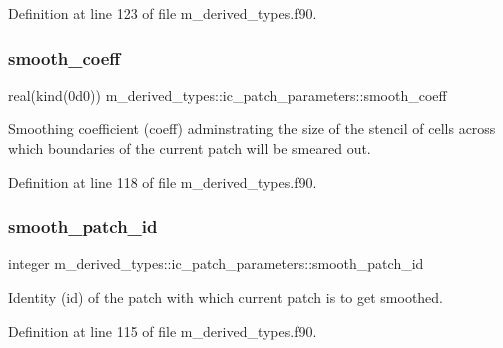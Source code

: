 Definition at line 123 of file m\+\_\+derived\+\_\+types.\+f90.

\mbox{\label{structm__derived__types_1_1ic__patch__parameters_a72c1ce27d5eb46084832a91e80ef6beb}} 
\subsubsection{\texorpdfstring{smooth\+\_\+coeff}{smooth\_coeff}}
{\footnotesize\ttfamily real(kind(0d0)) m\+\_\+derived\+\_\+types\+::ic\+\_\+patch\+\_\+parameters\+::smooth\+\_\+coeff}



Smoothing coefficient (coeff) adminstrating the size of the stencil of cells across which boundaries of the current patch will be smeared out. 



Definition at line 118 of file m\+\_\+derived\+\_\+types.\+f90.

\mbox{\label{structm__derived__types_1_1ic__patch__parameters_a1e1bb0d754aa7f3eaf43204794f18e05}} 
\subsubsection{\texorpdfstring{smooth\+\_\+patch\+\_\+id}{smooth\_patch\_id}}
{\footnotesize\ttfamily integer m\+\_\+derived\+\_\+types\+::ic\+\_\+patch\+\_\+parameters\+::smooth\+\_\+patch\+\_\+id}



Identity (id) of the patch with which current patch is to get smoothed. 



Definition at line 115 of file m\+\_\+derived\+\_\+types.\+f90.

